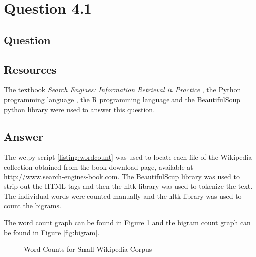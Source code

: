 \section{Question 4.1}

\subsection{Question}


\subsection{Resources}
The textbook \textit{Search Engines: Information Retrieval in Practice} \cite{seirip}, the Python programming language \cite{python}, the R programming language \cite{rlang} and the BeautifulSoup python library \cite{py:beautifulsoup} were used to answer this question.

\subsection{Answer}
The wc.py script \ref{listing:wordcount} was used to locate each file of the Wikipedia collection obtained from the book download page, available at \url{http://www.search-engines-book.com}.  The BeautifulSoup library was used to strip out the HTML tags and then the nltk library \cite{py:nltk} was used to tokenize the text.  The individual words were counted manually and the nltk library \cite{py:nltk} was used to count the bigrams.

The word count graph can be found in Figure \ref{fig:wc} and the bigram count graph can be found in Figure \ref{fig:bigram}.


\begin{figure}[h!]
\centering
\label{fig:wc}
\caption{Word Counts for Small Wikipedia Corpus}
\end{figure}

